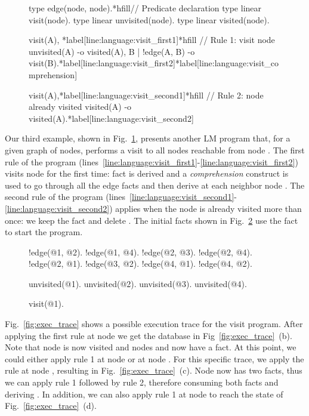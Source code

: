 
\begin{figure}[h!]
\begin{LineCode}[commandchars=\*\[\]]
type edge(node, node).*hfill// Predicate declaration
type linear visit(node).
type linear unvisited(node).
type linear visited(node).

visit(A), *label[line:language:visit_first1]*hfill // Rule 1: visit node
unvisited(A) -o
   visited(A),
   {B | !edge(A, B) -o visit(B)}.*label[line:language:visit_first2]*label[line:language:visit_comprehension]

visit(A),*label[line:language:visit_second1]*hfill // Rule 2: node already visited
visited(A)
   -o visited(A).*label[line:language:visit_second2]
\end{LineCode}
  \label{code:language:visit}
\end{figure}

Our third example, shown in Fig.~\ref{code:language:visit}, presents another LM
program that, for a given graph of nodes, performs a visit to all nodes
reachable from node . The first rule of the program
(lines~\ref{line:language:visit_first1}-\ref{line:language:visit_first2}) visits
node  for the first time: fact  is derived and a
\emph{comprehension} construct is used to go through all the edge facts and then
derive  at each neighbor node . The second rule of the
program
(lines~\ref{line:language:visit_second1}-\ref{line:language:visit_second2})
applies when the node is already visited more than once: we keep the
 fact and delete . The initial facts shown in
Fig.~\ref{code:language:visit_initial} use the  fact to start
the program.

\begin{figure}[h!]
\begin{LineCode}[commandchars=\*\[\]]
!edge(@1, @2).
!edge(@1, @4).
!edge(@2, @3).
!edge(@2, @4).
!edge(@2, @1).
!edge(@3, @2).
!edge(@4, @1).
!edge(@4, @2).

unvisited(@1).
unvisited(@2).
unvisited(@3).
unvisited(@4).

visit(@1).
\end{LineCode}
  \label{code:language:visit_initial}
\end{figure}

Fig.~\ref{fig:exec_trace} shows a possible execution trace for the visit
program. After applying the first rule at node  we get the database in
Fig~\ref{fig:exec_trace}~(b).  Note that node  is now visited and nodes
 and  now have a  fact. At this point, we could
either apply rule 1 at node  or at node .  For this specific
trace, we apply the rule at node , resulting in
Fig.~\ref{fig:exec_trace}~(c). Node  now has two  facts,
thus we can apply rule 1 followed by rule 2, therefore consuming both
 facts and deriving . In addition, we can also apply
rule 1 at node  to reach the state of Fig.~\ref{fig:exec_trace}~(d).

